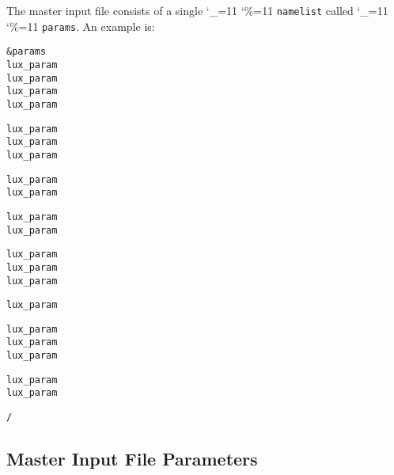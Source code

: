 \documentclass[11pt]{article}
\newcommand\ttcmd{\begingroup\catcode`\_=11 \catcode`\%=11 \dottcmd}
\newcommand\dottcmd[1]{\texttt{#1}\endgroup}
\newcommand{\vn}{\ttcmd}
\newenvironment{example}
  {\vspace{\ExBeg} \begin{alltt}}
  {\end{alltt} \vspace{\ExEnd}}
\newlength{\ExBeg}
\newlength{\ExEnd}
\begin{document}
The master input file consists of a single \vn{namelist} called \vn{params}.
An example is:
\begin{example}
  &params
    lux_param%
    lux_param%
    lux_param%
    lux_param%

    lux_param%
    lux_param%
    lux_param%

    lux_param%
    lux_param%

    lux_param%
    lux_param%

    lux_param%
    lux_param%
    lux_param%

    lux_param%

    lux_param%
    lux_param%
    lux_param%

    lux_param%
    lux_param%

  /
\end{example}

\subsection{Master Input File Parameters}
\label{ss:master.params}
\end{document}
